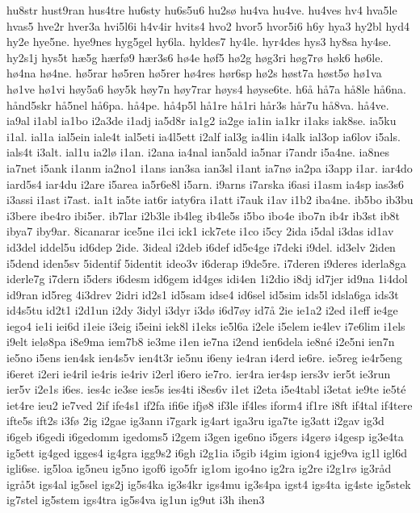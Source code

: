 {hu8str
hust9ran
hus4tre
hu6sty
hu6s5u6
hu2sø
hu4va
hu4ve.
hu4ves
hv4
hva5le
hvas5
hve2r
hver3a
hvi5l6i
h4v4ir
hvits4
hvo2
hvor5
hvor5i6
h6y
hya3
hy2bl
hyd4
hy2e
hye5ne.
hye9nes
hyg5gel
hy6la.
hyldes7
hy4le.
hyr4des
hys3
hy8sa
hy4se.
hy2s1j
hys5t
hæ5g
hærfø9
hær3s6
hø4e
høf5
hø2g
høg3ri
høg7rø
høk6
hø6le.
hø4na
hø4ne.
hø5rar
hø5ren
hø5rer
hø4res
hør6sp
hø2s
høst7a
høst5ø
hø1va
hø1ve
hø1vi
høy5a6
høy5k
høy7n
høy7rar
høys4
høyse6te.
h6å
hå7a
hå8le
hå6na.
hånd5skr
hå5nel
hå6pa.
hå4pe.
hå4p5l
hå1re
hå1ri
hår3s
hår7u
hå8va.
hå4ve.
ia9al
i1abl
ia1bo
i2a3de
i1adj
ia5d8r
ia1g2
ia2ge
ia1in
ia1kr
i1aks
iak8se.
ia5ku
i1al.
ial1a
ial5ein
iale4t
ial5eti
ia4l5ett
i2alf
ial3g
ia4lin
i4alk
ial3op
ia6lov
i5als.
ials4t
i3alt.
ial1u
ia2lø
i1an.
i2ana
ia4nal
ian5ald
ia5nar
i7andr
i5a4ne.
ia8nes
ia7net
i5ank
i1anm
ia2no1
i1ans
ian3sa
ian3sl
i1ant
ia7nø
ia2pa
i3app
i1ar.
iar4do
iard5s4
iar4du
i2are
i5area
ia5r6e8l
i5arn.
i9arns
i7arska
i6asi
i1asm
ia4sp
ias3s6
i3assi
i1ast
i7ast.
ia1t
ia5te
iat6r
iaty6ra
i1att
i7auk
i1av
i1b2
iba4ne.
ib5bo
ib3bu
i3bere
ibe4ro
ibi5er.
ib7lar
i2b3le
ib4leg
ib4le5s
i5bo
ibo4e
ibo7n
ib4r
ib3st
ib8t
ibya7
iby9ar.
8icanarar
ice5ne
i1ci
ick1
ick7ete
i1co
i5cy
2ida
i5dal
i3das
id1av
id3del
iddel5u
id6dep
2ide.
3ideal
i2deb
i6def
id5e4ge
i7deki
i9del.
id3elv
2iden
i5dend
iden5sv
5identif
5identit
ideo3v
i6derap
i9de5re.
i7deren
i9deres
iderla8ga
iderle7g
i7dern
i5ders
i6desm
id6gem
id4ges
idi4en
1i2dio
i8dj
id7jer
id9na
1i4dol
id9ran
id5reg
4i3drev
2idri
id2s1
id5sam
idse4
id6sel
id5sim
ids5l
idsla6ga
ids3t
id4s5tu
id2t1
i2d1un
i2dy
3idyl
i3dyr
i3dø
i6d7øy
id7å
2ie
ie1a2
i2ed
i1eff
ie4ge
iego4
ie1i
iei6d
i1eie
i3eig
i5eini
iek8l
i1eks
ie5l6a
i2ele
i5elem
ie4lev
i7e6lim
i1els
i9elt
ielø8pa
i8e9ma
iem7b8
ie3me
i1en
ie7na
i2end
ien6dela
ie8né
i2e5ni
ien7n
ie5no
i5ens
ien4sk
ien4s5v
ien4t3r
ie5nu
i6eny
ie4ran
i4erd
ie6re.
ie5reg
ie4r5eng
i6eret
i2eri
ie4ril
ie4ris
ie4riv
i2erl
i6ero
ie7ro.
ier4ra
ier4sp
iers3v
ier5t
ie3run
ier5v
i2e1s
i6es.
ies4c
ie3se
ies5s
ies4ti
i8es6v
i1et
i2eta
i5e4tabl
i3etat
ie9te
ie5té
iet4re
ieu2
ie7ved
2if
ife4s1
if2fa
ifi6e
ifjø8
if3le
if4les
iform4
if1re
i8ft
if4tal
if4tere
ifte5s
ift2s
i3fø
2ig
i2gae
ig3ann
i7gark
ig4art
iga3ru
iga7te
ig3att
i2gav
ig3d
i6geb
i6gedi
i6gedomm
igedoms5
i2gem
i3gen
ige6no
i5gers
i4gerø
i4gesp
ig3e4ta
ig5ett
ig4ged
igges4
ig4gra
igg9s2
i6gh
i2g1ia
i5gib
i4gim
igion4
igje9va
ig1l
igl6d
igli6se.
ig5loa
ig5neu
ig5no
igof6
igo5fr 
ig1om
igo4no
ig2ra
ig2re
i2g1rø
ig3råd
igrå5t
igs4al
ig5sel
igs2j
ig5s4ka
ig3s4kr
igs4mu
ig3s4pa
igst4
igs4ta
ig4ste
ig5stek
ig7stel
ig5stem
igs4tra
ig5s4va
ig1un
ig9ut
i3h
ihen3
}
